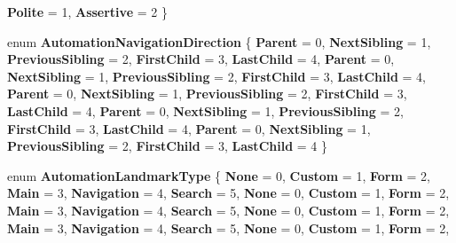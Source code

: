 \begin{DoxyCompactItemize}
{\bfseries Polite} = 1, 
{\bfseries Assertive} = 2
 \}
\item 
\mbox{\label{namespace_windows_1_1_u_i_1_1_xaml_1_1_automation_1_1_peers_a9b8626451e301972334ca5697b978934}} 
enum {\bfseries Automation\+Navigation\+Direction} \{ \newline
{\bfseries Parent} = 0, 
{\bfseries Next\+Sibling} = 1, 
{\bfseries Previous\+Sibling} = 2, 
{\bfseries First\+Child} = 3, 
\newline
{\bfseries Last\+Child} = 4, 
{\bfseries Parent} = 0, 
{\bfseries Next\+Sibling} = 1, 
{\bfseries Previous\+Sibling} = 2, 
\newline
{\bfseries First\+Child} = 3, 
{\bfseries Last\+Child} = 4, 
{\bfseries Parent} = 0, 
{\bfseries Next\+Sibling} = 1, 
\newline
{\bfseries Previous\+Sibling} = 2, 
{\bfseries First\+Child} = 3, 
{\bfseries Last\+Child} = 4, 
{\bfseries Parent} = 0, 
\newline
{\bfseries Next\+Sibling} = 1, 
{\bfseries Previous\+Sibling} = 2, 
{\bfseries First\+Child} = 3, 
{\bfseries Last\+Child} = 4, 
\newline
{\bfseries Parent} = 0, 
{\bfseries Next\+Sibling} = 1, 
{\bfseries Previous\+Sibling} = 2, 
{\bfseries First\+Child} = 3, 
\newline
{\bfseries Last\+Child} = 4
 \}
\item 
\mbox{\label{namespace_windows_1_1_u_i_1_1_xaml_1_1_automation_1_1_peers_a7841d4ce398126516a6081408b8e9c0d}} 
enum {\bfseries Automation\+Landmark\+Type} \{ \newline
{\bfseries None} = 0, 
{\bfseries Custom} = 1, 
{\bfseries Form} = 2, 
{\bfseries Main} = 3, 
\newline
{\bfseries Navigation} = 4, 
{\bfseries Search} = 5, 
{\bfseries None} = 0, 
{\bfseries Custom} = 1, 
\newline
{\bfseries Form} = 2, 
{\bfseries Main} = 3, 
{\bfseries Navigation} = 4, 
{\bfseries Search} = 5, 
\newline
{\bfseries None} = 0, 
{\bfseries Custom} = 1, 
{\bfseries Form} = 2, 
{\bfseries Main} = 3, 
\newline
{\bfseries Navigation} = 4, 
{\bfseries Search} = 5, 
{\bfseries None} = 0, 
{\bfseries Custom} = 1, 
\newline
{\bfseries Form} = 2, 

\end{DoxyCompactItemize}

